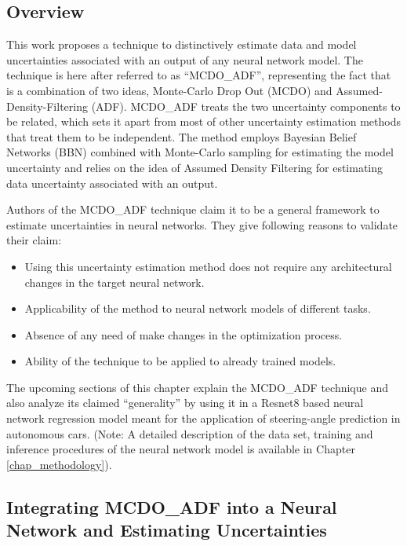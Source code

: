 	\subsection{Overview}\label{mcdo_adf_overview}
	This work proposes a technique to distinctively estimate data and model uncertainties associated with an output of any neural network model. The technique is here after referred to as \enquote{MCDO\_ADF}, representing the fact that is a combination of two ideas, Monte-Carlo Drop Out (MCDO) and Assumed-Density-Filtering (ADF). MCDO\_ADF treats the  two uncertainty components to be related, which sets it apart from most of other uncertainty estimation methods that treat them to be independent. The method employs Bayesian Belief Networks (BBN) combined with Monte-Carlo sampling for estimating the model uncertainty and relies on the idea of Assumed Density Filtering for  estimating data uncertainty associated with an output. 
	
	Authors of the MCDO\_ADF technique claim it to be a general framework to estimate uncertainties in neural networks. They give following reasons to validate their claim:
	\begin{itemize}
		\item Using this uncertainty estimation method does not require any architectural changes in the target neural network.
		\item Applicability of the method to neural network models of different tasks.
		\item Absence of any need of make changes in the optimization process.
		\item Ability of the technique to be applied to already trained models.
	\end{itemize}
	
	The upcoming sections of this chapter explain the MCDO\_ADF technique  and also analyze its claimed \enquote{generality} by using it in a Resnet8 based neural network regression model meant for the application of steering-angle prediction in autonomous cars. (Note: A detailed description of the data set, training and inference procedures of the neural network model is available in Chapter \ref{chap_methodology}).  
	
	
	\subsection{Integrating MCDO\_ADF into a Neural Network and Estimating Uncertainties}\label{integ_mcdo_adf}
